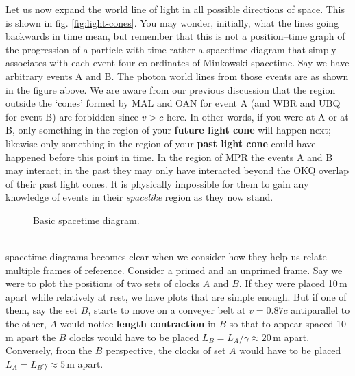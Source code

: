 \documentclass[english,seminar]{lecture}
\begin{document}
Let us now expand the world line of light in all possible directions of space. This is shown in fig. \ref{fig:light-cones}. You may wonder, initially, what the lines going backwards in time mean, but remember that this is not a position--time graph of the progression of a particle with time rather a spacetime diagram that simply associates with each event four co-ordinates of Minkowski spacetime. Say we have arbitrary events A and B. The photon world lines from those events are as shown in the figure above. We are aware from our previous discussion that the region outside the `cones' formed by MAL and OAN for event A (and WBR and UBQ for event B) are forbidden since $v>c$ here. In other words, if you were at A or at B, only something in the region of your \textbf{future light cone} will happen next; likewise only something in the region of your \textbf{past light cone} could have happened before this point in time. In the region of MPR the events A and B may interact; in the past they may only have interacted beyond the OKQ overlap of their past light cones. It is physically impossible for them to gain any knowledge of events in their \textit{spacelike} region as they now stand.

\begin{wrapfigure}{l}{0.55\textwidth}
	\caption{Basic spacetime diagram.}\label{fig:spacetime-two-frames}
\end{wrapfigure}

\\ spacetime diagrams becomes clear when we consider how they help us relate multiple frames of reference. Consider a primed and an unprimed frame. Say we were to plot the positions of two sets of clocks $A$ and $B$. If they were placed 10\,m apart while relatively at rest, we have plots that are simple enough. But if one of them, say the set $B$, starts to move on a conveyer belt at $v = 0.87c$ antiparallel to the other, $A$ would notice \textbf{length contraction} in $B$ so that to appear spaced 10\,m apart the $B$  clocks would have to be placed $L_B = L_A/\gamma \approx 20$\,m apart. Conversely, from the $B$ perspective, the clocks of set $A$ would have to be placed $L_A = L_B \gamma \approx 5$\,m apart.
\end{document}
